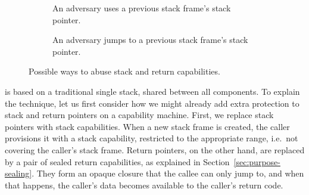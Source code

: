 \documentclass[acmsmall,screen]{acmart}\settopmatter{}
\begin{document}
\begin{figure}
\begin{subfigure}{0.4\linewidth}
    \caption{An adversary uses a previous stack frame's stack pointer.}
    \label{fig:stack-ptr-abuse}
  \end{subfigure}
  \begin{subfigure}{0.18\linewidth}
    \phantom{testtestes}
  \end{subfigure}
  \begin{subfigure}{0.4\linewidth}
    \centering
    \caption{An adversary jumps to a previous stack frame's stack pointer.}
    \label{fig:ret-ptr-abuse}
  \end{subfigure}
  
  \caption{Possible ways to abuse stack and return capabilities.}
  \label{fig:stack-ret-ptr-abuse}
\end{figure}

\stktokens{} is based on a traditional single stack, shared between all components.
To explain the technique, let us first consider how we might already add extra protection to stack and return pointers on a capability machine.
First, we replace stack pointers with stack capabilities.
When a new stack frame is created, the caller provisions it with a stack capability, restricted to the appropriate range, i.e.\ not covering the caller's stack frame.
Return pointers, on the other hand, are replaced by a pair of sealed return capabilities, as explained in Section~\ref{sec:purpose-sealing}.
They form an opaque closure that the callee can only jump to, and when that happens, the caller's data becomes available to the caller's return code. 
\end{document}
